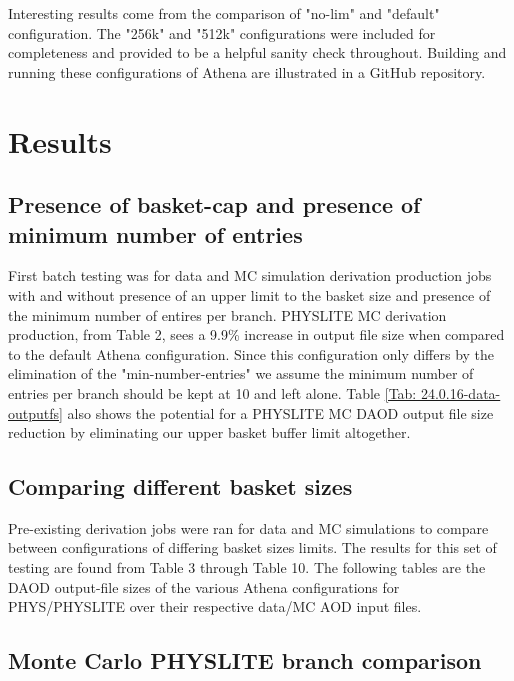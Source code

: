 Interesting results come from the comparison of "no-lim" and "default" configuration. The "256k" and "512k" configurations were included for completeness and provided to be a helpful sanity check throughout. 
Building and running these configurations of Athena are illustrated in a GitHub repository. \cite{Kraus}

\section{Results}
\subsection{Presence of basket-cap and presence of minimum number of entries}

First batch testing was for data and MC simulation derivation production jobs with and without presence of an upper limit to the basket size and presence of the minimum number of entires per branch. PHYSLITE MC derivation production, from Table 2, sees a 9.9\% increase in output file size when compared to the default Athena configuration. Since this configuration only differs by the elimination of the "min-number-entries" we assume the minimum number of entries per branch should be kept at 10 and left alone. Table \ref{Tab: 24.0.16-data-outputfs} also shows the potential for a PHYSLITE MC DAOD output file size reduction by eliminating our upper basket buffer limit altogether.  



\subsection{Comparing different basket sizes}

Pre-existing derivation jobs were ran for data and MC simulations to compare between configurations of differing basket sizes limits. The results for this set of testing are found from Table 3 through Table 10. The following tables are the DAOD output-file sizes of the various Athena configurations for PHYS/PHYSLITE over their respective data/MC AOD input files. 



\subsection{Monte Carlo PHYSLITE branch comparison}

